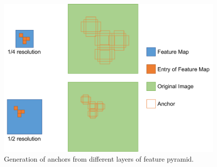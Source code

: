 \begin{figure}[!h]
	\centering
	\includegraphics[width=\figfi\textwidth]{3-13.pdf}
    \caption[Generation of anchors from different layers of feature pyramid]{Generation of anchors from different layers of feature pyramid.}
    \label{fig:ancdifflay}
\end{figure}